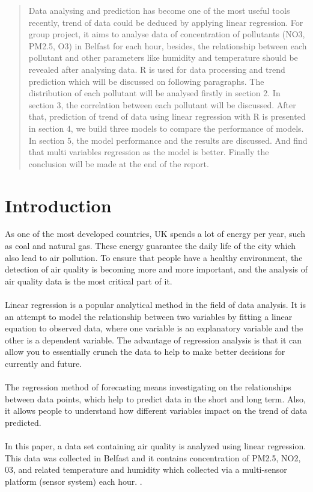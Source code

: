 \documentclass[a4paper,11pt,reqno]{report}
\begin{document}


\begin{abstract}
    Data analysing and prediction has become one of the most useful tools recently, 
    trend of data could be deduced by applying linear regression. 
    For group project, it aims to analyse data of concentration of pollutants (NO3, PM2.5, O3) in Belfast for each hour, 
    besides, the relationship between each pollutant and other parameters like humidity and temperature should be revealed after analysing data. R is used for data processing and trend prediction which will be discussed on following paragraphs. 
    The distribution of each pollutant will be analysed firstly in section 2. 
    In section 3, the correlation between each pollutant will be discussed. 
    After that, prediction of trend of data using linear regression with R is presented in section 4, we build three models to compare the performance of models. In section 5, the model performance and the results are discussed. And find that multi variables regression as the model is better. Finally the conclusion will be made at the end of the report. 
\end{abstract}

\section{Introduction}
\label{sec:Introduction}
As one of the most developed countries, UK spends a lot of energy per year, such as coal and natural gas. These energy guarantee the daily life of the city which also lead to air pollution. To ensure that people have a healthy environment, the detection of air quality is becoming more and more important, and the analysis of air quality data is the most critical part of it.
\\
\\
Linear regression is a popular analytical method in the field of data analysis. It is an attempt to model the relationship between two variables by fitting a linear equation to observed data, where one variable is an explanatory variable and the other is a dependent variable. The advantage of regression analysis is that it can allow you to essentially crunch the data to help to make better decisions for currently and future.
\\
\\
The regression method of forecasting means investigating on the relationships between data points, which help to predict data in the short and long term. Also, it allows people to understand how different variables impact on the trend of data predicted.
\\
\\
In this paper, a data set containing air quality is analyzed using linear regression. This data was collected in Belfast and it contains concentration of PM2.5, NO2, 03, and related temperature and humidity which collected via a multi-sensor platform (sensor system) each hour. .
\newpage
\end{document}

